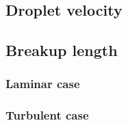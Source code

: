 \documentclass[ccbysa,note,git]{bmtreport}
\begin{document}
\subsection{Droplet velocity}

\subsection{Breakup length}

\subsubsection{Laminar case}

\subsubsection{Turbulent case}



\printbibliography[notcategory=ignore]
\end{document}
